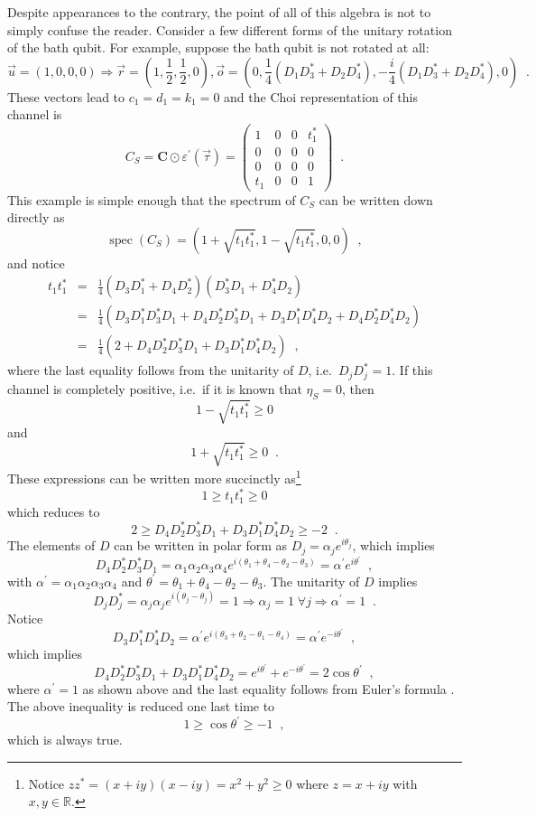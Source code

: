 Despite appearances to the contrary, the point of all of this algebra is not to simply confuse the reader.  Consider a few different forms of the unitary rotation of the bath qubit.  For example, suppose the bath qubit is not rotated at all:
$$
\vec{u} = (1,0,0,0) \Rightarrow \vec{r} = \left(1,\frac{1}{2},\frac{1}{2},0\right),\vec{o}=\left(0,\frac{1}{4}\left(D_1D_3^*+D_2D_4^*\right),-\frac{i}{4}\left(D_1D_3^*+D_2D_4^*\right),0\right)\;\;.
$$
These vectors lead to $c_1=d_1=k_1=0$ and the Choi representation of this channel is
$$
C_S = \mathbf{C}\odot\varepsilon^\prime(\vec{\tau}) = \begin{pmatrix}
1 &0 &0 &t_1^* \\
0 &0 &0 &0\\
0 &0 &0 &0\\
t_1 &0 &0 &1
\end{pmatrix}\;\;.
$$
This example is simple enough that the spectrum of $C_S$ can be written down directly as
$$
\operatorname{spec}(C_S) = \left(1+\sqrt{t_1t_1^*},1-\sqrt{t_1t_1^*},0,0\right)\;\;,
$$
and notice
\begin{eqnarray*}
t_1 t_1^* &=& \frac{1}{4} \left(D_3 D_1^* + D_4 D_2^*\right)\left(D_3^* D_1 + D_4^* D_2\right)\\
&=& \frac{1}{4} \left(D_3 D_1^* D_3^* D_1 + D_4 D_2^* D_3^* D_1 + D_3 D_1^* D_4^* D_2 + D_4 D_2^* D_4^* D_2\right)\\
&=& \frac{1}{4}\left(2 + D_4 D_2^* D_3^* D_1 + D_3 D_1^* D_4^* D_2\right)\;\;,
\end{eqnarray*}
where the last equality follows from the unitarity of $D$, i.e.\ $D_jD_j^* = 1$.  If this channel is completely positive, i.e.\ if it is known that $\eta_S=0$, then
$$
1-\sqrt{t_1t_1^*} \ge 0
$$
and
$$
1+\sqrt{t_1t_1^*} \ge 0\;\;.
$$
These expressions can be written more succinctly as\footnote{Notice $zz^*=(x+iy)(x-iy)=x^2+y^2\ge 0$ where $z=x+iy$ with $x,y\in\mathbb{R}$.}
$$
1\ge t_1 t_1^* \ge 0
$$
which reduces to
$$
2 \ge D_4 D_2^* D_3^* D_1 + D_3 D_1^* D_4^* D_2 \ge -2 \;\;.
$$
The elements of $D$ can be written in polar form as $D_j = \alpha_je^{i\theta_j}$, which implies
$$
D_4 D_2^* D_3^* D_1 = \alpha_1\alpha_2\alpha_3\alpha_4e^{i(\theta_1+\theta_4-\theta_2-\theta_3)} = \alpha^\prime e^{i\theta^\prime}\;\;,
$$
with $\alpha^\prime = \alpha_1\alpha_2\alpha_3\alpha_4$ and $\theta^\prime = \theta_1+\theta_4-\theta_2-\theta_3$.  The unitarity of $D$ implies 
$$
D_jD^*_j=\alpha_j\alpha_je^{i(\theta_j-\theta_j)}=1\Rightarrow\alpha_j=1\;\forall j\Rightarrow\alpha^\prime=1\;\;.
$$
Notice
$$
D_3 D_1^* D_4^* D_2 = \alpha^\prime e^{i(\theta_3+\theta_2-\theta_1-\theta_4)} = \alpha^\prime e^{-i\theta^\prime}\;\;,
$$
which implies
$$
D_4 D_2^* D_3^* D_1 + D_3 D_1^* D_4^* D_2 = e^{i\theta^\prime} + e^{-i\theta^\prime} = 2\cos{\theta^\prime}\;\;,
$$
where $\alpha^\prime = 1$ as shown above and the last equality follows from Euler's formula \cite{Feynman1963}.  The above inequality is reduced one last time to
$$
1\ge \cos{\theta^\prime} \ge -1\;\;,
$$
which is always true.  

